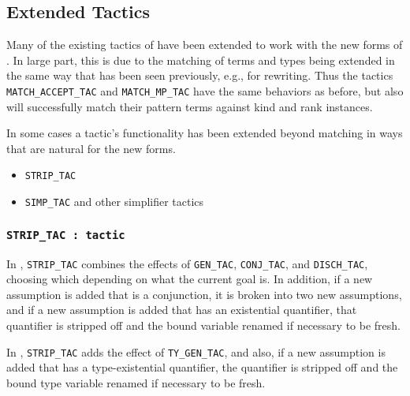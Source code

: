 \subsection{Extended Tactics}

Many of the existing tactics of \HOL{} have been extended
to work with the new forms of \HOLW.
In large part, this is due to the matching of terms and types being
extended in the same way that has been seen previously, e.g., for rewriting.
Thus the tactics \texttt{MATCH\_ACCEPT\_TAC} and \texttt{MATCH\_MP\_TAC}
have the same behaviors as before, but also will successfully match their
pattern terms against kind and rank instances.

In some cases a tactic's functionality has been extended beyond matching
in ways that are natural for the new forms.


\begin{itemize}
\item \texttt{STRIP\_TAC}
\item \texttt{SIMP\_TAC} and other simplifier tactics
\end{itemize}

\subsubsection{\texttt{STRIP\_TAC : tactic}}

In \HOL, \texttt{STRIP\_TAC} combines the effects of
\texttt{GEN\_TAC}, \texttt{CONJ\_TAC}, and \texttt{DISCH\_TAC},
choosing which depending on what the current goal is.
In addition, if a new assumption is added that is a conjunction,
it is broken into two new assumptions, and
if a new assumption is added that has an existential quantifier,
that quantifier is stripped off and the bound variable renamed if necessary
to be fresh.

In \HOLW{}, \texttt{STRIP\_TAC} adds the effect of \texttt{TY\_GEN\_TAC},
and also, if a new assumption is added that has a type-existential quantifier,
the quantifier is stripped off
and the bound type variable renamed if necessary to be fresh.

